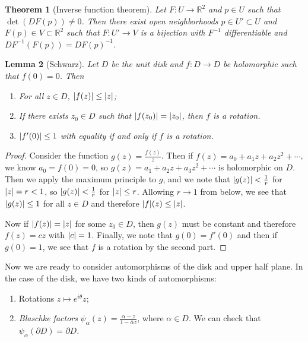 \documentclass[leqno, openany]{memoir}
\newtheorem{thm}{Theorem}[section]
\newtheorem{lem}[thm]{Lemma}
\theoremstyle{definition}
\theoremstyle{remark}
\theoremstyle{plain}
\theoremstyle{definition}
\theoremstyle{remark}
\newcommand{\R}{\mathbb{R}}
\newcommand{\ol}[1]{\overline{#1}}
\begin{document}
\begin{thm}[Inverse function theorem]
    Let $F \colon U \to \R^2$ and $p \in U$ such that $\det (DF(p)) \neq 0$. Then there exist open neighborhoods $p \in U' \subset U$ and $F(p) \in V \subset \R^2$ such that $F \colon U' \to V$ is a bijection with $F^{-1}$ differentiable and $DF^{-1}(F(p)) = {DF(p)}^{-1}$.
\end{thm}

\begin{lem}[Schwarz]
    Let $D$ be the unit disk and $f \colon D \to D$ be holomorphic such that $f(0) = 0$. Then
    \begin{enumerate}
        \item For all $z \in D$, $\abs{f(z)} \leq \abs{z}$;
        \item If there exists $z_0 \in D$ such that $\abs{f(z_0)} = \abs{z_0}$, then $f$ is a rotation.
        \item $\abs{f'(0)} \leq 1$ with equality if and only if $f$ is a rotation.
    \end{enumerate}
\end{lem}

\begin{proof}
    Consider the function $g(z) = \frac{f(z)}{z}$. Then if $f(z) = a_0 + a_1 z + a_2 z^2 + \cdots$, we know $a_0 = f(0) = 0$, so $g(z) = a_1 + a_2 z + a_3 z^2 + \cdots$ is holomorphic on $D$. Then we apply the maximum principle to $g$, and we note that $\abs{g(z)} < \frac{1}{r}$ for $\abs{z} = r < 1$, so $\abs{g(z)} < \frac{1}{r}$ for $\abs{z} \leq r$. Allowing $r \to 1$ from below, we see that $\abs{g(z)} \leq 1$ for all $z \in D$ and therefore $\abs{f}(z) \leq \abs{z}$.

    Now if $\abs{f(z)} = \abs{z}$ for some $z_0 \in D$, then $g(z)$ must be constant and therefore $f(z) = cz$ with $\abs{c} = 1$. Finally, we note that $g(0) = f'(0)$ and then if $g(0) = 1$, we see that $f$ is a rotation by the second part.
\end{proof}

Now we are ready to consider automorphisms of the disk and upper half plane. In the case of the disk, we have two kinds of automorphisms:
\begin{enumerate}
    \item Rotations $z \mapsto e^{i\theta}z$;
    \item \textit{Blaschke factors} $\psi_{\alpha}(z) = \frac{\alpha - z}{1 - \ol{\alpha}z}$, where $\alpha \in D$. We can check that $\psi_{\alpha}(\partial D) = \partial D$. 
\end{enumerate}
\end{document}
